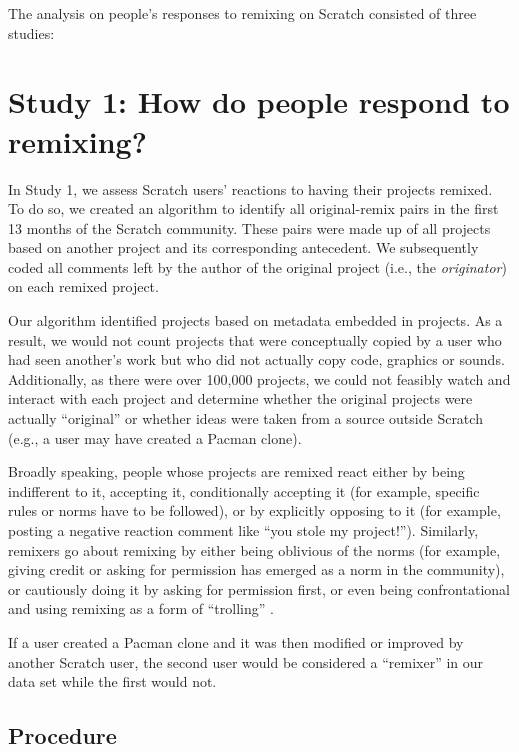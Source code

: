The analysis on people's responses to remixing on Scratch consisted of three studies:

\section{Study 1: How do people respond to remixing?}

In Study 1, we assess Scratch users' reactions to having their projects
remixed. To do so, we created an algorithm to
identify all original-remix pairs in the first
13 months of the Scratch community. These pairs were made up of all
projects based on another project and its corresponding antecedent.  We
subsequently coded all comments left by the author of the original
project (i.e., the {\em originator}) on each remixed project.

Our algorithm identified projects based on metadata embedded in projects. As a result, we
would not count projects that were conceptually copied by a user who had
seen another's work but who did not actually copy code, graphics or
sounds.  Additionally, as there were over 100,000 projects, we could not
feasibly watch and interact with each project and determine whether the
original projects were actually ``original'' or whether ideas were taken
from a source outside Scratch (e.g., a user may have created a Pacman
clone).

Broadly speaking, people whose projects are remixed react either by being indifferent to it, accepting it, conditionally accepting it (for example, specific rules or norms have to be followed), or by explicitly opposing to it (for example, posting a negative reaction comment like ``you stole my project!'').
Similarly, remixers go about remixing by either being oblivious of the norms (for example, giving credit or asking for permission has emerged as a norm in the  community), or cautiously doing it by asking for permission first, or even being confrontational and using remixing as a form of ``trolling'' \citep{donath_identity_1998}.

If a user created a Pacman clone and it was then modified or
improved by another Scratch user, the second user would be considered a
 ``remixer'' in our data set while the first would not.

\subsection{Procedure}

